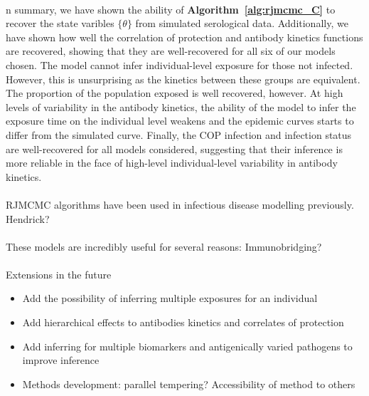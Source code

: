 \documentclass{article}
\begin{document}
\paragraph{}n summary, we have shown the ability of \textbf{Algorithm~\ref{alg:rjmcmc_C}} to recover the state varibles $\{\theta\}$ from simulated serological data. Additionally, we have shown how well the correlation of protection and antibody kinetics functions are recovered, showing that they are well-recovered for all six of our models chosen. The model cannot infer individual-level exposure for those not infected. However, this is unsurprising as the kinetics between these groups are equivalent. The proportion of the population exposed is well recovered, however. At high levels of variability in the antibody kinetics, the ability of the model to infer the exposure time on the individual level weakens and the epidemic curves starts to differ from the simulated curve. Finally, the COP infection and infection status are well-recovered for all models considered, suggesting that their inference is more reliable in the face of high-level individual-level variability in antibody kinetics. 

\paragraph{}RJMCMC algorithms have been used in infectious disease modelling previously. Hendrick? 

\paragraph{}These models are incredibly useful for several reasons: Immunobridging?

\paragraph{}Extensions in the future
\begin{itemize}
\item Add the possibility of inferring multiple exposures for an individual
\item Add hierarchical effects to antibodies kinetics and correlates of protection
\item Add inferring for multiple biomarkers and antigenically varied pathogens to improve inference
\item Methods development: parallel tempering? Accessibility of method to others 
\end{itemize}
\end{document}
